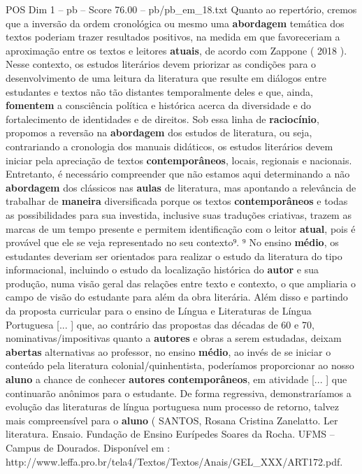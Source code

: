 \begin{textsample}{POS Dim 1 – pb – Score 76.00 – pb/pb\_em\_18.txt}
Quanto ao repertório, cremos que a inversão da ordem cronológica ou mesmo uma \textbf{abordagem} temática dos textos poderiam trazer resultados positivos, na medida em que favoreceriam a aproximação entre os textos e leitores \textbf{atuais}, de acordo com Zappone ( 2018 ).
Nesse contexto, os estudos literários devem priorizar as condições para o desenvolvimento de uma leitura da literatura que resulte em diálogos entre estudantes e textos não tão distantes temporalmente deles e que, ainda, \textbf{fomentem} a consciência política e histórica acerca da diversidade e do fortalecimento de identidades e de direitos.
Sob essa linha de \textbf{raciocínio}, propomos a reversão na \textbf{abordagem} dos estudos de literatura, ou seja, contrariando a cronologia dos manuais didáticos, os estudos literários devem iniciar pela apreciação de textos \textbf{contemporâneos}, locais, regionais e nacionais.
Entretanto, é necessário compreender que não estamos aqui determinando a não \textbf{abordagem} dos clássicos nas \textbf{aulas} de literatura, mas apontando a relevância de trabalhar de \textbf{maneira} diversificada porque os textos \textbf{contemporâneos} e todas as possibilidades para sua investida, inclusive suas traduções criativas, trazem as marcas de um tempo presente e permitem identificação com o leitor \textbf{atual}, pois é provável que ele se veja representado no seu contexto⁹. ⁹ No ensino \textbf{médio}, os estudantes deveriam ser orientados para realizar o estudo da literatura do tipo informacional, incluindo o estudo da localização histórica do \textbf{autor} e sua produção, numa visão geral das relações entre texto e contexto, o que ampliaria o campo de visão do estudante para além da obra literária.
Além disso e partindo da proposta curricular para o ensino de Língua e Literaturas de Língua Portuguesa [... ] que, ao contrário das propostas das décadas de 60 e 70, nominativas/impositivas quanto a \textbf{autores} e obras a serem estudadas, deixam \textbf{abertas} alternativas ao professor, no ensino \textbf{médio}, ao invés de se iniciar o conteúdo pela literatura colonial/quinhentista, poderíamos proporcionar ao nosso \textbf{aluno} a chance de conhecer \textbf{autores} \textbf{contemporâneos}, em atividade [... ] que continuarão anônimos para o estudante.
De forma regressiva, demonstraríamos a evolução das literaturas de língua portuguesa num processo de retorno, talvez mais compreensível para o \textbf{aluno} ( SANTOS, Rosana Cristina Zanelatto.
Ler literatura.
Ensaio.
Fundação de Ensino Eurípedes Soares da Rocha.
UFMS – Campus de Dourados.
Disponível em : http://www.leffa.pro.br/tela4/Textos/Textos/Anais/GEL\_XXX/ART172.pdf.

\end{textsample}
